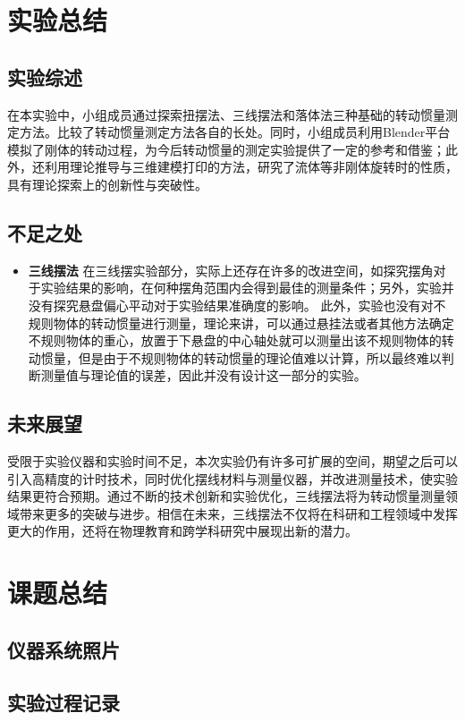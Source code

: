 \documentclass[12pt,hyperref,a4paper,UTF8]{ctexart}
\begin{document}
\begin{itemize}
\section{实验总结}
\subsection{实验综述}
在本实验中，小组成员通过探索扭摆法、三线摆法和落体法三种基础的转动惯量测定方法。比较了转动惯量测定方法各自的长处。同时，小组成员利用Blender平台模拟了刚体的转动过程，为今后转动惯量的测定实验提供了一定的参考和借鉴；此外，还利用理论推导与三维建模打印的方法，研究了流体等非刚体旋转时的性质，具有理论探索上的创新性与突破性。
\subsection{不足之处}
    \begin{itemize}
        \item \textbf{三线摆法}
        在三线摆实验部分，实际上还存在许多的改进空间，如探究摆角对于实验结果的影响，在何种摆角范围内会得到最佳的测量条件；另外，实验并没有探究悬盘偏心平动对于实验结果准确度的影响。
        此外，实验也没有对不规则物体的转动惯量进行测量，理论来讲，可以通过悬挂法或者其他方法确定不规则物体的重心，放置于下悬盘的中心轴处就可以测量出该不规则物体的转动惯量，但是由于不规则物体的转动惯量的理论值难以计算，所以最终难以判断测量值与理论值的误差，因此并没有设计这一部分的实验。
    \end{itemize}
\subsection{未来展望}
    受限于实验仪器和实验时间不足，本次实验仍有许多可扩展的空间，期望之后可以引入高精度的计时技术，同时优化摆线材料与测量仪器，并改进测量技术，使实验结果更符合预期。通过不断的技术创新和实验优化，三线摆法将为转动惯量测量领域带来更多的突破与进步。相信在未来，三线摆法不仅将在科研和工程领域中发挥更大的作用，还将在物理教育和跨学科研究中展现出新的潜力。
\section{课题总结}
\subsection{仪器系统照片}

\subsection{实验过程记录}


\end{itemize}
\end{document}

